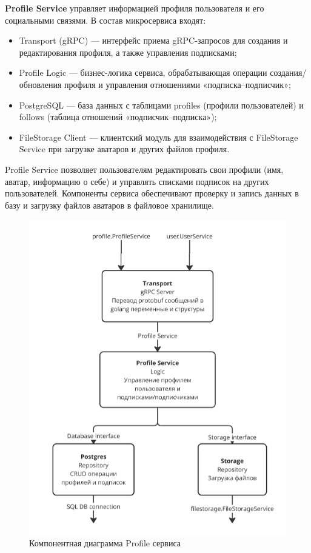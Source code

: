 \textbf{Profile Service} управляет информацией профиля пользователя и его социальными связями. В состав микросервиса входят:
\begin{itemize}
    \item Transport (gRPC) — интерфейс приема gRPC-запросов для создания и редактирования профиля, а также управления подписками;
    \item Profile Logic — бизнес-логика сервиса, обрабатывающая операции создания/обновления профиля и управления отношениями «подписка–подписчик»;
    \item PostgreSQL — база данных с таблицами profiles (профили пользователей) и follows (таблица отношений «подписчик–подписка»);
    \item FileStorage Client — клиентский модуль для взаимодействия с FileStorage Service при загрузке аватаров и других файлов профиля.
\end{itemize}
Profile Service позволяет пользователям редактировать свои профили (имя, аватар, информацию о себе) и управлять списками подписок на других пользователей. Компоненты сервиса обеспечивают проверку и запись данных в базу и загрузку файлов аватаров в файловое хранилище.
\begin{figure}[H]
        \centering
        \includegraphics[width=0.8\linewidth]{Images/second_chapter_backend_architecture/Picture4.png}
        \caption{Компонентная диаграмма Profile сервиса}
        \label{fig:profile-service-component-diagram}
\end{figure}

